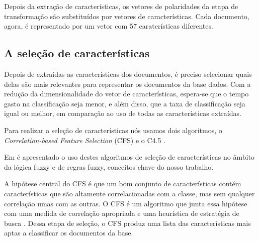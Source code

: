 \documentclass[template.tex]{subfiles}
\begin{document}
Depois da extração de características, os vetores de polaridades da etapa de transformação são substituídos por vetores de características. Cada documento, agora, é representado por um vetor com 57 caraterísticas diferentes. 

\subsection{A seleção de características}

Depois de extraídas as características dos documentos, é preciso selecionar quais delas são mais relevantes para representar os documentos da base dados. Com a redução da dimensionalidade do vetor de características, espera-se que o tempo gasto na classificação seja menor, e além disso, que a taxa de classificação seja igual ou melhor, em comparação ao uso de todas as características extraídas.


Para realizar a seleção de características nós usamos dois algoritmos, o \textit{Correlation-based Feature Selection} (CFS) e o C4.5 \cite{cintra2008fuzzy}. 


Em  é apresentado o uso destes algoritmos de seleção de características no âmbito da lógica fuzzy e de regras fuzzy, conceitos chave do nosso trabalho. 

A hipótese central do CFS é que um bom conjunto de características contém características que são altamente correlacionadas com a classe, mas sem qualquer correlação umas com as outras. O CFS é um algoritmo que junta essa hipótese com uma medida de correlação apropriada e uma heurística de estratégia de busca \cite{hall1999correlation}. Dessa etapa de seleção, o CFS produz uma lista das características mais aptas a classificar os documentos da base. 

\end{document}

